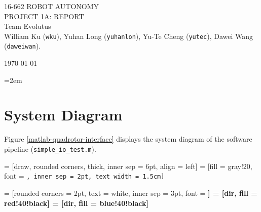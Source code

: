 \documentclass[letter, 10pt]{article}
\def\helv{\fontfamily{phv}\bfseries\selectfont}
\begin{document}
\begin{onehalfspacing}

{\noindent\Large\uppercase{16-662 Robot Autonomy}\\[8pt]
{\Huge PROJECT 1A: REPORT}}\\[4pt]

{\noindent\scriptsize Team Evolutus \\[-0.5\baselineskip]
\noindent\scriptsize William Ku ({\tt wku}), Yuhan Long ({\tt yuhanlon}), Yu-Te Cheng ({\tt yutec}), Dawei Wang ({\tt daweiwan}).} 
	
\noindent\today

\pagestyle{fancy}

\setlength{\parskip}{0.5\baselineskip}
\RaggedRight
\parindent=2em

\section{System Diagram}

Figure \ref{matlab-quadrotor-interface} displays the system diagram of the
software pipeline ({\tt simple\_io\_test.m}).

 = [draw, rounded corners, thick, inner sep = 6pt, align = left]
 = [fill = gray!20, font = \tt\scriptsize, inner sep = 2pt, text width = 1.5cm]

 = [rounded corners = 2pt, text = white, inner sep = 3pt, font = \helv\scriptsize]
 = [dir, fill = red!40!black]
 = [dir, fill = blue!40!black]

\begin{figure}[h!]
	\centering
	
	\begin{tikzpicture}[node distance = 2pt]
	

\end{tikzpicture}
\end{figure}
\end{onehalfspacing}
\end{document}
